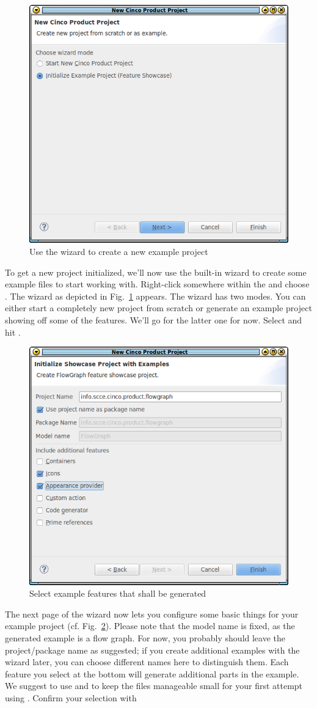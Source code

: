 \documentclass[a4paper,american,12pt]{scrreprt}
\begin{document}
\begin{figure}
	\centering
	\includegraphics[width=.5\textwidth]{screenshots/new-cp-wizard.png}
	\caption{Use the wizard to create a new example project}
	\label{fig:cpWizard}
\end{figure}

To get a new  project initialized, we'll now use the
built-in wizard to create some example files to start working with.
Right-click somewhere within the  and choose . The wizard as depicted in Fig.~\ref{fig:cpWizard} appears. The wizard
has two modes. You can either start a completely new project from scratch or
generate an example project showing off some of the \cinco{} features. We'll go for
the latter one for now. Select  and hit . 

\begin{figure}
	\centering
	\includegraphics[width=.5\textwidth]{screenshots/new-cp-wizard2.png}
	\caption{Select example features that shall be generated}
	\label{fig:cpWizard2}
\end{figure}

The next page of the wizard now lets you configure some basic things for your
example project (cf. Fig.~\ref{fig:cpWizard2}). Please note that the model name
is fixed, as the generated example is a flow graph. For now, you probably should leave
the project/package name as suggested; if you create additional examples with
the wizard later, you can choose different names here to distinguish them. Each
feature you select at the bottom will generate additional parts in the example.
We suggest to use  and  to keep the files
manageable small for your first attempt using \cinco{}. Confirm your
selection with 
\end{document}
